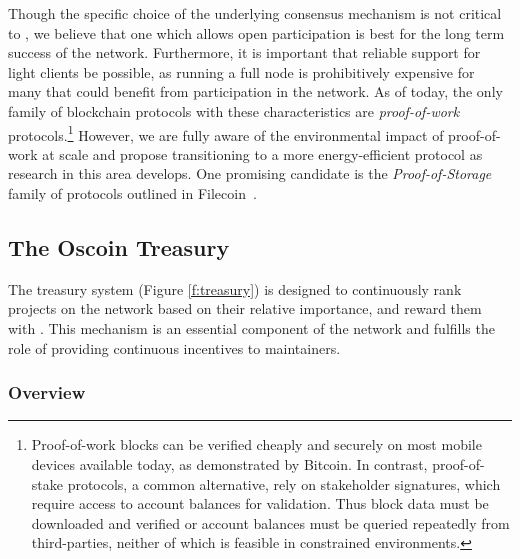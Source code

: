 Though the specific choice of the underlying consensus mechanism is not
critical to \oscoin{}, we believe that one which allows open
participation is best for the long term success of the network. Furthermore,
it is important that reliable support for light clients be possible, as
running a full node is prohibitively expensive for many that could
benefit from participation in the \oscoin{} network. As of today, the only family of
blockchain protocols with these characteristics are \emph{proof-of-work}
protocols.\footnote{Proof-of-work blocks
can be verified cheaply and securely on most mobile devices available
today, as demonstrated by Bitcoin. In contrast, proof-of-stake protocols,
a common alternative, rely on stakeholder signatures, which require access to
account balances for validation. Thus block data must be downloaded and
verified or account balances must be queried repeatedly from third-parties,
neither of which is feasible in constrained environments.} However, we are
fully aware of the environmental impact of proof-of-work at
scale and propose transitioning to a more energy-efficient protocol as research in
this area develops. One promising candidate is the \emph{Proof-of-Storage} family of
protocols outlined in Filecoin~\cite{filecoin}.

\begin{figure*}[!ht]
    \par\medskip\noindent\minipage{\linewidth}
    \centering
    
    \caption{The \Oscoin{} Treasury System\label{f:treasury}}
    \endminipage\par\medskip
\end{figure*}

\subsection{The Oscoin Treasury}
\label{s:treasury}

The treasury system (Figure \ref{f:treasury}) is designed to continuously
rank projects on the network based on their relative importance, and reward them with
\oscoin{}. This mechanism is an essential component of the network and fulfills the
role of providing continuous incentives to maintainers.

\subsubsection{Overview}


